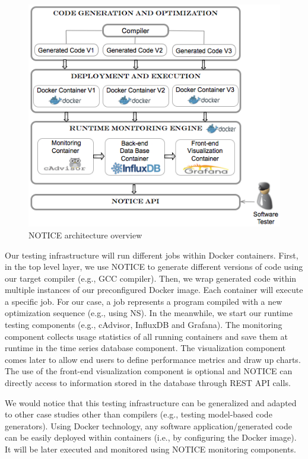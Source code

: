 \begin{figure}[h]
\centering
	\includegraphics[width=1.\linewidth]{Ressources/genecoApproach.png}
	\caption{NOTICE architecture overview}
\end{figure}


Our testing infrastructure will run different jobs within Docker containers. First, in the top level layer, we use NOTICE to generate different versions of code using our target compiler (e.g., GCC compiler). Then, we wrap generated code within multiple instances of our preconfigured Docker image. Each container will execute a specific job. For our case, a job represents a program compiled with a new optimization sequence (e.g., using NS). In the meanwhile, we start our runtime testing components (e.g., cAdvisor, InfluxDB and Grafana). The monitoring component collects usage statistics of all running containers and save them at runtime in the time series database component. The visualization component comes later to allow end users to define performance metrics and draw up charts. The use of the front-end visualization component is optional and NOTICE can directly access to information stored in the database through REST API calls.  
\begin{remark}
We would notice that this testing infrastructure can be generalized and adapted to other case studies other than compilers (e.g., testing model-based code generators). Using Docker technology, any software application/generated code can be easily deployed within containers (i.e., by configuring the Docker image). It will be later executed and monitored using NOTICE monitoring components. 
\end{remark}

